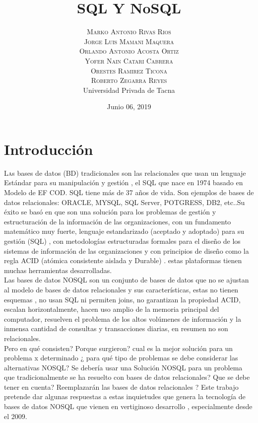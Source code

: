 \documentclass[twoside,twocolumn]{article}
\title{SQL Y NoSQL} %
\author{%
\textsc{Marko Antonio Rivas Rios} \\[1ex] %
\textsc{Jorge Luis Mamani Maquera} \\[1.01ex] %
\textsc{Orlando Antonio Acosta Ortiz} \\[1.02ex] %
\textsc{Yofer Nain Catari Cabrera} \\[1.03ex] %
\textsc{Orestes Ramirez Ticona} \\[1.04ex] %
\textsc{Roberto Zegarra Reyes} \\[1.05ex] %
\normalsize Universidad Privada de Tacna \\  %
\normalsize {} %
}
\date{Junio 06, 2019} %
\begin{document}
\maketitle


\section{Introducción}

\lettrine[nindent=0em,lines=2]{L}as bases de datos (BD) tradicionales son las relacionales que usan un lenguaje Estándar para su manipulación y gestión , el SQL que nace en 1974 basado en Modelo de EF COD. SQL tiene más de 37 años de vida. Son ejemplos de bases de datos relacionales: ORACLE, MYSQL, SQL Server, POTGRESS, DB2, etc..Su éxito se basó en que son una solución para los problemas de gestión y estructuración  de la información  de las organizaciones, con un fundamento matemático muy fuerte, lenguaje estandarizado (aceptado y adoptado)  para su gestión (SQL) , con metodologías estructuradas formales para el diseño de los sistemas de información de las organizaciones y con principios de diseño  como la regla ACID (atómica consistente aislada y Durable) . estas plataformas tienen muchas herramientas desarrolladas.\textbf{}\\
Las bases de datos NOSQL son un conjunto de bases de datos que no se ajustan al modelo de bases de datos relacionales y sus características, estas no tienen esquemas  , no usan SQL ni permiten joins, no garantizan la propiedad ACID,  escalan horizontalmente, hacen uso amplio de la memoria principal del computador, resuelven el problema de los altos volúmenes de información y la inmensa cantidad de consultas y transacciones diarias, en resumen no son relacionales.\textbf{}\\
Pero en qué consisten? Porque surgieron? cual es la mejor solución para un problema x determinado ¿ para qué tipo de problemas se debe considerar las alternativas NOSQL? Se debería usar una Solución NOSQL para un problema que tradicionalmente se ha resuelto con bases de datos relacionales? Que se debe tener en cuenta? Reemplazarán las bases de datos relacionales ?
Este trabajo pretende dar algunas respuestas a estas inquietudes que genera la tecnología de bases de datos NOSQL que vienen en vertiginoso desarrollo , especialmente desde el 2009.
\end{document}
